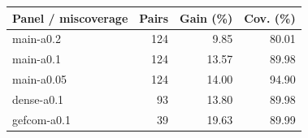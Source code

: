 \begin{tabular}{lrrr}
\toprule
Panel / miscoverage & Pairs & Gain (\%) & Cov. (\%) \\
\midrule
main-a0.2 & 124 & 9.85 & 80.01 \\
main-a0.1 & 124 & 13.57 & 89.98 \\
main-a0.05 & 124 & 14.00 & 94.90 \\
dense-a0.1 & 93 & 13.80 & 89.98 \\
gefcom-a0.1 & 39 & 19.63 & 89.99 \\
\bottomrule
\end{tabular}